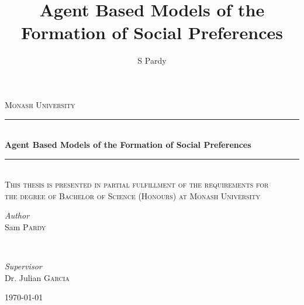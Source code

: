 \documentclass[11pt]{book}
\title{Agent Based Models of the Formation of Social Preferences}
\author{S Pardy}
\begin{document}
\begin{titlepage}
	\newcommand{\HRule}{\rule{\linewidth}{0.5mm}} %
	
	\center %

	\textsc{\LARGE Monash University}\\[1.5cm]	

	
	\HRule\\[0.4cm]
	
	{\huge\bfseries Agent Based Models of the Formation of Social Preferences}\\[0.4cm]
	
	\HRule\\[1.5cm]
	
	
	
	\textsc{\large This thesis is presented in partial fulfillment of the requirements for\\ the degree of Bachelor of Science (Honours) at Monash University}\\[0.5cm] %
	
	\vfill
	\vfill
	
	\begin{minipage}{0.4\textwidth}
		\begin{flushleft}
			\large
			\textit{Author}\\
			Sam \textsc{Pardy}
		\end{flushleft}
	\end{minipage}
	~
	\begin{minipage}{0.4\textwidth}
		\begin{flushright}
			\large 
			\textit{Supervisor}\\
			Dr. Julian \textsc{Garcia}   
		\end{flushright}
	\end{minipage}
	
	
	\vfill\vfill\vfill %
	
	{\large\today} %

	\vfill %
	
\end{titlepage}
\end{document}
